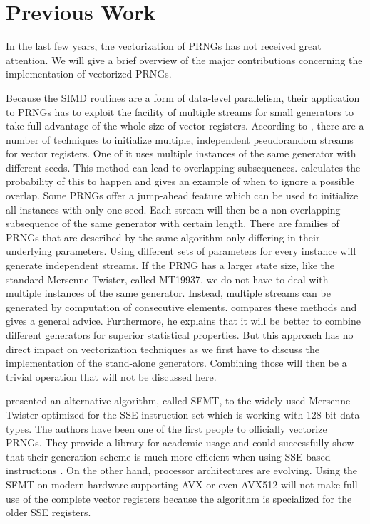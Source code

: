 \documentclass{stdlocal}
\begin{document}
\section{Previous Work} %
\label{sec:previous_work}
  In the last few years, the vectorization of PRNGs has not received great attention.
  We will give a brief overview of the major contributions concerning the implementation of vectorized PRNGs.

  Because the SIMD routines are a form of data-level parallelism, their application to PRNGs has to exploit the facility of multiple streams for small generators to take full advantage of the whole size of vector registers.
  According to \textcite{fog2015}, there are a number of techniques to initialize multiple, independent pseudorandom streams for vector registers.
  One of it uses multiple instances of the same generator with different seeds.
  This method can lead to overlapping subsequences.
  \citeauthor{fog2015} calculates the probability of this to happen and gives an example of when to ignore a possible overlap.
  Some PRNGs offer a jump-ahead feature which can be used to initialize all instances with only one seed.
  Each stream will then be a non-overlapping subsequence of the same generator with certain length.
  There are families of PRNGs that are described by the same algorithm only differing in their underlying parameters.
  Using different sets of parameters for every instance will generate independent streams.
  If the PRNG has a larger state size, like the standard Mersenne Twister, called MT19937, we do not have to deal with multiple instances of the same generator.
  Instead, multiple streams can be generated by computation of consecutive elements.
  \citeauthor{fog2015} compares these methods and gives a general advice.
  Furthermore, he explains that it will be better to combine different generators for superior statistical properties.
  But this approach has no direct impact on vectorization techniques as we first have to discuss the implementation of the stand-alone generators.
  Combining those will then be a trivial operation that will not be discussed here.

  \textcite{saito2008} presented an alternative algorithm, called SFMT, to the widely used Mersenne Twister optimized for the SSE instruction set which is working with 128-bit data types.
  The authors have been one of the first people to officially vectorize PRNGs.
  They provide a library for academic usage and could successfully show that their generation scheme is much more efficient when using SSE-based instructions \autocite{sfmt}.
  On the other hand, processor architectures are evolving.
  Using the SFMT on modern hardware supporting AVX or even AVX512 will not make full use of the complete vector registers because the algorithm is specialized for the older SSE registers.
\end{document}
